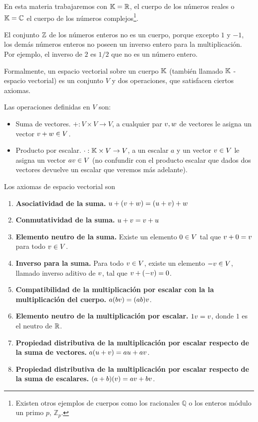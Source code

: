 En esta materia trabajaremos con $\mathbb K = \mathbb R$, el cuerpo de los n\'umeros reales o $\mathbb K =  \mathbb C$ el cuerpo de los números complejos\footnote{Existen otros ejemplos de cuerpos como los racionales $\mathbb{Q}$ o los enteros módulo un primo $p$, $\mathbb{Z}_p$.}.

\begin{ejemplo}
El conjunto $\mathbb Z$ de los números enteros no es un cuerpo, porque excepto $1$ y $-1$, los demás números enteros no poseen un inverso entero para la multiplicación. Por ejemplo, el inverso de $2$ es $1/2$ que no es un número entero.
\end{ejemplo}


Formalmente, un espacio vectorial sobre un cuerpo $\mathbb K$  (tambi\'en llamado $\mathbb K$ - espacio vectorial) es un conjunto $V$ y dos operaciones, que satisfacen ciertos axiomas.

Las operaciones definidas en $V$ son:

\begin{itemize}
\item Suma de vectores. $+:V \times V \rightarrow V$, a cualquier par $\vb, \wb$ de vectores le asigna un vector $\vb+\wb \in V$.
\item Producto por escalar. $\cdot : \mathbb K \times V \rightarrow V$, a un escalar $a$ y un vector $\vb \in V$ le asigna un vector $a\vb \in V$ (no confundir con el producto escalar que dados dos vectores devuelve un escalar que veremos más adelante).
\end{itemize}

Los axiomas de espacio vectorial son

\begin{enumerate}
\item   \textbf{Asociatividad de la suma.} $\ub + (\vb + \wb) = (\ub + \vb) + \wb$
\item   \textbf{Conmutatividad de la suma.} $\ub + \vb = \vb + \ub$
\item   \textbf{Elemento neutro de la suma.} Existe un elemento $\cero \in V$ tal que $\vb + \cero = \vb$ para todo $\vb \in V$.
\item   \textbf{Inverso para la suma.} Para todo $\vb \in V$, existe un elemento $-\vb \in V$, llamado inverso aditivo de $\vb$, tal que $\vb + (-\vb) = 0$.
\item   \textbf{Compatibilidad de la multiplicación por escalar con la la multiplicación del cuerpo.} $a(bv) = (ab)\vb$.
\item   \textbf{Elemento neutro de la multiplicación por escalar.} $1 \vb = \vb$, donde $1$ es el neutro de $\mathbb R$.
\item   \textbf{Propiedad distributiva de la multiplicación por escalar respecto de la suma de vectores.} $a(\ub+\vb) = au + av$.
\item   \textbf{Propiedad distributiva de la multiplicación por escalar respecto de la suma de escalares.} $(a+b)(\vb) = av + bv$.
\end{enumerate}

